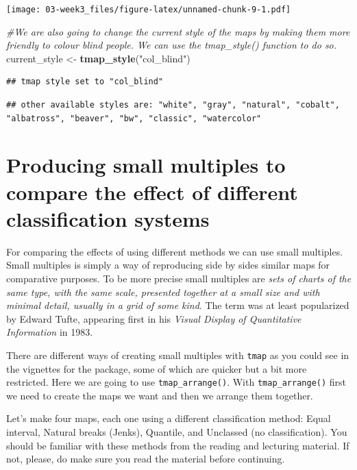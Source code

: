 \documentclass[]{book}
\newenvironment{Shaded}{\begin{snugshade}}{\end{snugshade}}
\newcommand{\CommentTok}[1]{\textcolor[rgb]{0.56,0.35,0.01}{\textit{#1}}}
\newcommand{\KeywordTok}[1]{\textcolor[rgb]{0.13,0.29,0.53}{\textbf{#1}}}
\newcommand{\NormalTok}[1]{#1}
\newcommand{\StringTok}[1]{\textcolor[rgb]{0.31,0.60,0.02}{#1}}
\begin{document}
\texttt{[image: 03-week3\_files/figure-latex/unnamed-chunk-9-1.pdf]}

\begin{Shaded}
\begin{Highlighting}[]
\CommentTok{#We are also going to change the current style of the maps by making them more friendly to colour blind people. We can use the tmap_style() function to do so.}
\NormalTok{current_style <-}\StringTok{ }\KeywordTok{tmap_style}\NormalTok{(}\StringTok{"col_blind"}\NormalTok{)}
\end{Highlighting}
\end{Shaded}

\begin{verbatim}
## tmap style set to "col_blind"
\end{verbatim}

\begin{verbatim}
## other available styles are: "white", "gray", "natural", "cobalt", "albatross", "beaver", "bw", "classic", "watercolor"
\end{verbatim}

\hypertarget{producing-small-multiples-to-compare-the-effect-of-different-classification-systems}{%
\section{Producing small multiples to compare the effect of different classification systems}\label{producing-small-multiples-to-compare-the-effect-of-different-classification-systems}}

For comparing the effects of using different methods we can use small multiples. Small multiples is simply a way of reproducing side by sides similar maps for comparative purposes. To be more precise small multiples are \emph{sets of charts of the same type, with the same scale, presented together at a small size and with minimal detail, usually in a grid of some kind}. The term was at least popularized by Edward Tufte, appearing first in his \emph{Visual Display of Quantitative Information} in 1983.

There are different ways of creating small multiples with \texttt{tmap} as you could see in the vignettes for the package, some of which are quicker but a bit more restricted. Here we are going to use \texttt{tmap\_arrange()}. With \texttt{tmap\_arrange()} first we need to create the maps we want and then we arrange them together.

Let's make four maps, each one using a different classification method: Equal interval, Natural breaks (Jenks), Quantile, and Unclassed (no classification). You should be familiar with these methods from the reading and lecturing material. If not, please, do make sure you read the material before continuing.
\end{document}
